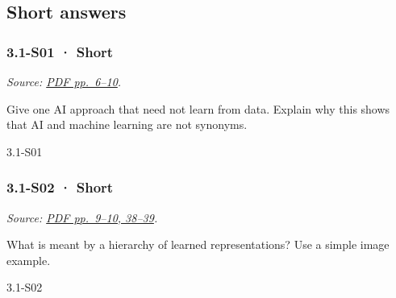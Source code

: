 \subsection{Short answers}\label{short-answers-7}

\noindent\begin{minipage}{\linewidth}

\subsubsection{3.1-S01 · Short}\label{s01-short-7}

\emph{Source:
\href{../Lecture\%20Slides/3.1.\%20Introduction\%20to\%20Deep\%20Learning.pdf\#page=6}{PDF
pp.~6--10}.}

Give one AI approach that need not learn from data. Explain why this
shows that AI and machine learning are not synonyms.

\begin{solution}[20mm]{3.1-S01}

\end{solution}
\end{minipage}\par\medskip

\noindent\begin{minipage}{\linewidth}

\subsubsection{3.1-S02 · Short}\label{s02-short-7}

\emph{Source:
\href{../Lecture\%20Slides/3.1.\%20Introduction\%20to\%20Deep\%20Learning.pdf\#page=9}{PDF
pp.~9--10, 38--39}.}

What is meant by a hierarchy of learned representations? Use a simple
image example.

\begin{solution}[20mm]{3.1-S02}

\end{solution}
\end{minipage}\par\medskip


